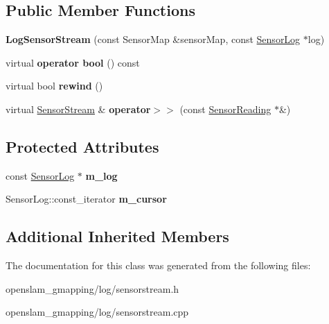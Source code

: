 \subsection*{Public Member Functions}
\begin{DoxyCompactItemize}
\item 
\mbox{\label{classGMapping_1_1LogSensorStream_af9ea71d5ac4d61d63bd3e82842857776}} 
{\bfseries Log\+Sensor\+Stream} (const Sensor\+Map \&sensor\+Map, const \hyperlink{classGMapping_1_1SensorLog}{Sensor\+Log} $\ast$log)
\item 
\mbox{\label{classGMapping_1_1LogSensorStream_a8512e8c3f37299a789549ab824b22f88}} 
virtual {\bfseries operator bool} () const
\item 
\mbox{\label{classGMapping_1_1LogSensorStream_abd5a13a34f6cd54d23c57bcee19f0989}} 
virtual bool {\bfseries rewind} ()
\item 
\mbox{\label{classGMapping_1_1LogSensorStream_a2d97bbca00e85df656c6197baae30843}} 
virtual \hyperlink{classGMapping_1_1SensorStream}{Sensor\+Stream} \& {\bfseries operator$>$$>$} (const \hyperlink{classGMapping_1_1SensorReading}{Sensor\+Reading} $\ast$\&)
\end{DoxyCompactItemize}
\subsection*{Protected Attributes}
\begin{DoxyCompactItemize}
\item 
\mbox{\label{classGMapping_1_1LogSensorStream_a9fbfc955698895ff4b9ed92377deb79c}} 
const \hyperlink{classGMapping_1_1SensorLog}{Sensor\+Log} $\ast$ {\bfseries m\+\_\+log}
\item 
\mbox{\label{classGMapping_1_1LogSensorStream_a7f4e8f175750fa008e6a438acf78687e}} 
Sensor\+Log\+::const\+\_\+iterator {\bfseries m\+\_\+cursor}
\end{DoxyCompactItemize}
\subsection*{Additional Inherited Members}


The documentation for this class was generated from the following files\+:\begin{DoxyCompactItemize}
\item 
openslam\+\_\+gmapping/log/sensorstream.\+h\item 
openslam\+\_\+gmapping/log/sensorstream.\+cpp\end{DoxyCompactItemize}
